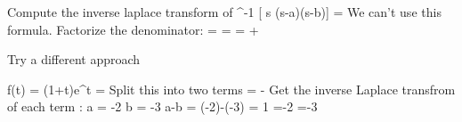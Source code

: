 
\frame{


}

Compute the inverse laplace transform of  
^{-1} [ {s \over (s-a)(s-b)}] =
We can't use this formula.
Factorize the denominator:
 = 
 =  =  + 

Try a different approach

f(t)  = (1+t)e^t
 = 
Split this into two terms
 =  - 
Get the inverse Laplace transfrom of each term
 :
a = -2
b = -3
a-b = (-2)-(-3) = 1
 ={-2 }
 ={-3 }
